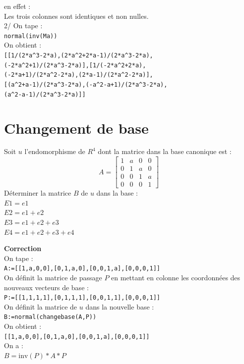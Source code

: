 \documentclass[a4paper,11pt]{book}
\begin{document}
en effet :\\
Les trois colonnes sont identiques et non nulles.\\
2/ On tape :\\
{\tt normal(inv(Ma))}\\
On obtient :\\
{\tt [[1/(2*a\verb|^|3-2*a),(2*a\verb|^|2+2*a-1)/(2*a\verb|^|3-2*a),}\\
{\tt (-2*a\verb|^|2+1)/(2*a\verb|^|3-2*a)],[1/(-2*a\verb|^|2+2*a),}\\
{\tt (-2*a+1)/(2*a\verb|^|2-2*a),(2*a-1)/(2*a\verb|^|2-2*a)],}\\
{\tt [(a\verb|^|2+a-1)/(2*a\verb|^|3-2*a),(-a\verb|^|2-a+1)/(2*a\verb|^|3-2*a),}\\
{\tt (a\verb|^|2-a-1)/(2*a\verb|^|3-2*a)]]}

\section{Changement de base}
Soit $u$ l'endomorphisme de $R^4$ dont la matrice dans la base canonique est :
$$A=
\left [\begin{array}{rrrr}
1&a&0&0\\
0&1&a&0\\
0&0&1&a\\
0&0&0&1 
\end{array}
\right]$$
D\'eterminer la matrice $B$ de $u$ dans la base :\\
$E1=e1$\\
$E2=e1+e2$\\
$E3=e1+e2+e3$\\
$E4=e1+e2+e3+e4$

{\bf Correction}\\
On tape :\\
{\tt A:=[[1,a,0,0],[0,1,a,0],[0,0,1,a],[0,0,0,1]]}\\
On d\'efinit la matrice de passage $P$ en mettant en colonne les coordonn\'ees 
des nouveaux vecteurs de base :\\
{\tt P:=[[1,1,1,1],[0,1,1,1],[0,0,1,1],[0,0,0,1]]}\\
On d\'efinit la matrice de $u$ dans la nouvelle base :\\
{\tt B:=normal(changebase(A,P))}\\
On obtient :\\
{\tt [[1,a,0,0],[0,1,a,0],[0,0,1,a],[0,0,0,1]]}\\
On a : \\
$B=\mbox{inv}(P)*A*P$
\end{document}
